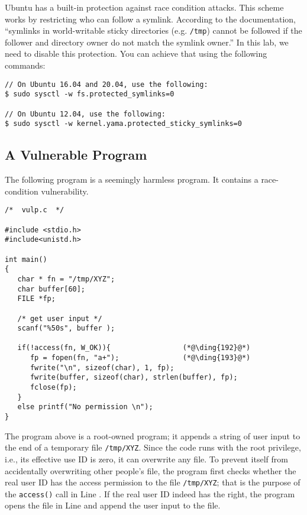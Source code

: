 Ubuntu has a built-in protection against race condition 
attacks. This scheme works by restricting who can follow a symlink. 
According to the documentation, ``symlinks in world-writable sticky 
directories (e.g. {\tt /tmp}) cannot be followed if the follower and directory 
owner do not match the symlink owner.''
In this lab, we need to disable this protection. You can achieve
that using the following commands:

\begin{lstlisting}
// On Ubuntu 16.04 and 20.04, use the following:
$ sudo sysctl -w fs.protected_symlinks=0

// On Ubuntu 12.04, use the following:
$ sudo sysctl -w kernel.yama.protected_sticky_symlinks=0
\end{lstlisting}



\subsection{A Vulnerable Program}


The following program is a seemingly harmless program. It contains a race-condition
vulnerability. 

\begin{lstlisting}
/*  vulp.c  */

#include <stdio.h>
#include<unistd.h>

int main()
{
   char * fn = "/tmp/XYZ";
   char buffer[60];
   FILE *fp;

   /* get user input */
   scanf("%50s", buffer );

   if(!access(fn, W_OK)){                 (*@\ding{192}@*)
      fp = fopen(fn, "a+");               (*@\ding{193}@*)
      fwrite("\n", sizeof(char), 1, fp);
      fwrite(buffer, sizeof(char), strlen(buffer), fp);
      fclose(fp);
   }
   else printf("No permission \n");
}
\end{lstlisting}

The program above is a root-owned \setuid program;
it appends a string of user input to
the end of a temporary file {\tt /tmp/XYZ}. Since the code runs
with the root privilege, i.e., its effective use ID is zero, it 
can overwrite any file. To prevent itself from accidentally
overwriting other people's file, the program first 
checks whether the real user ID has the access permission to the file
{\tt /tmp/XYZ}; that is the purpose of the {\tt access()} call in Line
.  If the real user ID indeed has 
the right, the program opens the file in Line  and append the user
input to the file. 

